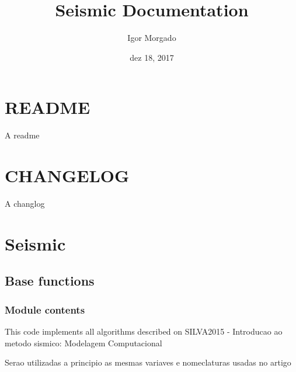 \documentclass[letterpaper,10pt,brazil]{sphinxmanual}
\title{Seismic Documentation}
\date{dez 18, 2017}
\author{Igor Morgado}
\begin{document}
\maketitle
\sphinxtableofcontents
{}\label{\detokenize{index::doc}}



\chapter{README}
\label{\detokenize{readme:readme}}\label{\detokenize{readme:welcome-to-seismic-s-documentation}}\label{\detokenize{readme::doc}}
A readme


\chapter{CHANGELOG}
\label{\detokenize{changelog::doc}}\label{\detokenize{changelog:changelog}}
A changlog


\chapter{Seismic}
\label{\detokenize{source/modules::doc}}\label{\detokenize{source/modules:seismic}}

\section{Base functions}
\label{\detokenize{source/base:base-functions}}\label{\detokenize{source/base::doc}}

\subsection{Module contents}
\label{\detokenize{source/base:module-base}}\label{\detokenize{source/base:module-contents}}
This code implements all algorithms described on
SILVA2015 - Introducao ao metodo sismico: Modelagem Computacional

Serao utilizadas a principio as mesmas variaves e nomeclaturas usadas
no artigo
\end{document}
